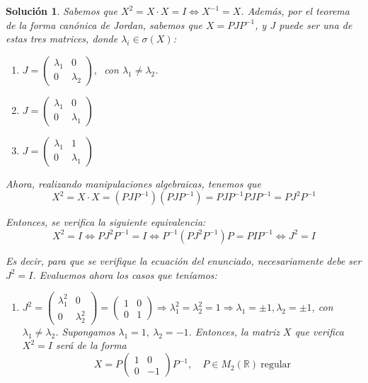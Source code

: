 \documentclass[11pt, a4paper]{article}
\newif\IfInSansMode
\newcommand{\R}{\mathbb{R}}
\theoremstyle{theorem-style}
\theoremstyle{definition-style}
\theoremstyle{remark-style}
\newtheorem*{sol}{Solución}
\theoremstyle{example-style}
\newenvironment{nlist}
{\begin{enumerate}
    \renewcommand\labelenumi{(\emph{\roman{enumi})}}}
{\end{enumerate}}
\begin{document}
    \begin{sol} Sabemos que $X^2 = X \cdot X = I \iff X^{-1} = X$. Además, por el \textit{teorema de la forma canónica de Jordan}, sabemos que $X = PJP^{-1}$, y $J$ puede ser una de estas tres matrices, donde $\lambda_i \in \sigma(X)$:
        \begin{nlist}
        \item $J =
            \begin{pmatrix}
                \lambda_1 & 0\\
                0 & \lambda_2
            \end{pmatrix},\ $ con $\lambda_1 \neq \lambda_2$.
        \item  $J =
            \begin{pmatrix}
                \lambda_1 & 0\\
                0 & \lambda_1
            \end{pmatrix}$
        \item  $J =
            \begin{pmatrix}
                \lambda_1 & 1 \\
                0 & \lambda_1
            \end{pmatrix}$
        \end{nlist}

        Ahora, realizando manipulaciones algebraicas, tenemos que
        $$X^2 = X\cdot X = (PJP^{-1})(PJP^{-1}) = PJP^{-1}PJP^{-1} = PJ^2P^{-1}$$

        Entonces, se verifica la siguiente equivalencia: $$X^2 = I \iff PJ^2P^{-1} = I \iff P^{-1}(PJ^2P^{-1})P = P I P^{-1} \iff J^2 = I$$

        Es decir, para que se verifique la ecuación del enunciado, necesariamente debe ser $J^2 = I$. Evaluemos ahora los casos que teníamos:
        \begin{nlist}
        \item $J^2 =
            \begin{pmatrix}
                \lambda_1^2 & 0 \\
                0 & \lambda_2^2
            \end{pmatrix} =
            \begin{pmatrix}
                1 & 0 \\
                0 & 1
            \end{pmatrix} \Rightarrow \lambda_1^2 = \lambda_2^2 = 1 \Rightarrow
            \lambda_1 = \pm 1, \lambda_2 = \pm 1$, con $\lambda_1 \ne \lambda_2$. Supongamos $\lambda_1 = 1,\ \lambda_2 = -1$. Entonces, la matriz $X$ que verifica $X^2 = I$ será de la forma
            $$X = P
            \begin{pmatrix}
                1 &  0\\
                0& -1
            \end{pmatrix}P^{-1},\quad P \in M_2(\R)\ \text{regular}$$


\end{nlist}
\end{sol}
\end{document}
